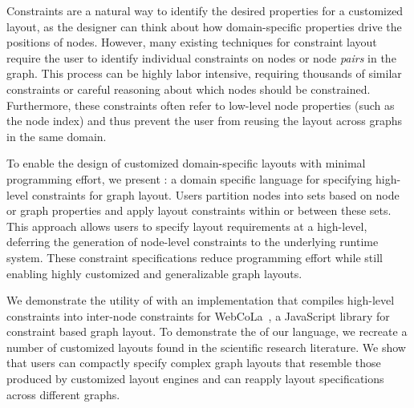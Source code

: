 Constraints are a natural way to identify the desired properties for a
customized layout, as the designer can think about how domain-specific
properties drive the positions of nodes. However, many existing techniques
for constraint layout require the user to identify individual constraints
on nodes or node \emph{pairs} in the graph. This process can be highly labor
intensive, requiring thousands of similar constraints or careful reasoning
about which nodes should be constrained. Furthermore, these constraints often
refer to low-level node properties (such as the node index) and thus prevent
the user from reusing the layout across graphs in the same domain.

To enable the design of customized domain-specific layouts with minimal
programming effort, we present \projectname: a domain specific language for
specifying high-level constraints for graph layout. Users partition nodes
into sets based on node or graph properties and apply layout constraints
within or between these sets. This approach allows users to specify layout
requirements at a high-level, deferring the generation of
node-level constraints to the underlying runtime system. These constraint
specifications reduce programming effort while still enabling highly
customized and generalizable graph layouts.

We demonstrate the utility of \projectname with an implementation that 
compiles high-level constraints into inter-node constraints for
WebCoLa~\cite{WebCoLa}, a JavaScript library for constraint based graph
layout. To demonstrate the  of our language, we
recreate a number of customized layouts found in the scientific research 
literature. We
show that users can compactly specify complex graph layouts that resemble
those produced by customized layout engines and can reapply layout
specifications across different graphs.
